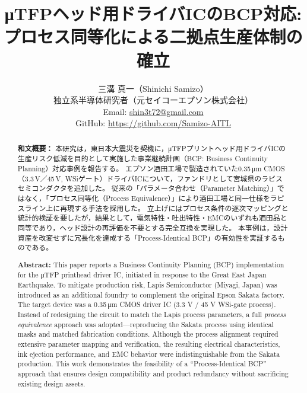 \documentclass[conference]{IEEEtran}
\begin{document}
\title{%
μTFPヘッド用ドライバICのBCP対応:\\
プロセス同等化による二拠点生産体制の確立
}

\author{%
三溝 真一（Shinichi Samizo）\\
独立系半導体研究者（元セイコーエプソン株式会社）\\
Email: \href{mailto:shin3t72@gmail.com}{shin3t72@gmail.com} \\
GitHub: \url{https://github.com/Samizo-AITL}
}

\maketitle

\begin{abstract}
\textbf{和文概要：}
本研究は，東日本大震災を契機に，μTFPプリントヘッド用ドライバICの生産リスク低減を目的として実施した事業継続計画（BCP: Business Continuity Planning）対応事例を報告する。
エプソン酒田工場で製造されていた0.35\,μm CMOS（3.3\,V／45\,V, WSiゲート）ドライバICについて，ファンドリとして宮城県のラピスセミコンダクタを追加した。
従来の「パラメータ合わせ（Parameter Matching）」ではなく，「プロセス同等化（Process Equivalence）」により酒田工場と同一仕様をラピスライン上に再現する手法を採用した。
立上げにはプロセス条件の逐次マッピングと統計的検証を要したが，結果として，電気特性・吐出特性・EMCのいずれも酒田品と同等であり，ヘッド設計の再評価を不要とする完全互換を実現した。
本事例は，設計資産を改変せずに冗長化を達成する「Process-Identical BCP」の有効性を実証するものである。

\medskip
\textbf{Abstract:}
This paper reports a Business Continuity Planning (BCP) implementation for the μTFP printhead driver IC, initiated in response to the Great East Japan Earthquake.
To mitigate production risk, Lapis Semiconductor (Miyagi, Japan) was introduced as an additional foundry to complement the original Epson Sakata factory.
The target device was a 0.35\,μm CMOS driver IC (3.3 V / 45 V WSi-gate process). 
Instead of redesigning the circuit to match the Lapis process parameters, a full \textit{process equivalence} approach was adopted—reproducing the Sakata process using identical masks and matched fabrication conditions.
Although the process alignment required extensive parameter mapping and verification, the resulting electrical characteristics, ink ejection performance, and EMC behavior were indistinguishable from the Sakata production.
This work demonstrates the feasibility of a “Process-Identical BCP” approach that ensures design compatibility and product redundancy without sacrificing existing design assets.
\end{abstract}
\end{document}

